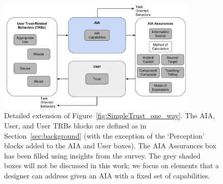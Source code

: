     \begin{figure}[htbp]
        \centering
        \includegraphics[width=0.85\textwidth]{Figures/RefinedTrust_one_way}
        \caption{Detailed extension of Figure~\ref{fig:SimpleTrust_one_way}. The AIA, User, and User TRBs blocks are defined as in Section~\ref{sec:background} (with the exception of the `Perception' blocks added to the AIA and User boxes). The AIA Assurances box has been filled using insights from the survey. The grey shaded boxes will not be discussed in this work; we focus on elements that a designer can address given an AIA with a fixed set of capabilities.}
        \label{fig:refined_assurances}
    \end{figure}









% 
